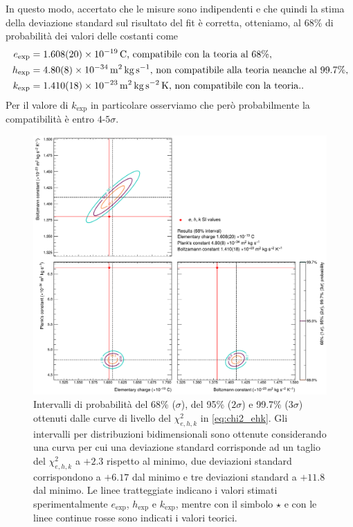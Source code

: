 \documentclass[a4paper, varvw, nofootinbib]{revtex4-2}
\begin{document}
In questo modo, accertato che le misure sono indipendenti e che quindi la stima della deviazione standard sul risultato del fit è corretta, otteniamo, al $68\%$ di probabilità dei valori delle costanti come \[
    \begin{aligned}
        e_\text{exp} &= \SI{1.608 +- 0.020 e-19}{\coulomb}\text{, compatibile con la teoria al $68\%$},\\
        h_\text{exp} &= \SI{4.80 +- 0.08 e-34}{\metre\squared\kilo\gram\per\second}\text{, non compatibile alla teoria neanche al 99.7\%},\\
        k_\text{exp} &= \SI{1.410 +- 0.018 e-23}{\metre\squared\kilo\gram\per\second\squared\kelvin}\text{, non compatibile con la teoria.}.
    \end{aligned}
\] Per il valore di $k_\text{exp}$ in particolare osserviamo che però probabilmente la compatibilità è entro $4$-$5\sigma$. 

\begin{figure}
\centering
\includegraphics[width=15cm]{fig/ehk_contour_plot_68}
\caption{Intervalli di probabilità del 68\% ($\sigma$), del 95\% ($2\sigma$) e 99.7\% ($3\sigma$) ottenuti dalle curve di livello del $\chi^2_{e,h,k}$ in \eqref{eq:chi2_ehk}. Gli intervalli per distribuzioni bidimensionali sono ottenute considerando una curva per cui una deviazione standard corrisponde ad un taglio del $\chi^2_{e,h,k}$ a $+2.3$ rispetto al minimo, due deviazioni standard corrispondono a $+6.17$ dal minimo e tre deviazioni standard a $+11.8$ dal minimo. Le linee tratteggiate indicano i valori stimati sperimentalmente $e_\text{exp}$, $h_\text{exp}$ e $k_\text{exp}$, mentre con il simbolo $\star$ e con le linee continue rosse sono indicati i valori teorici.}\label{fig:3}
\end{figure}




\end{document}
